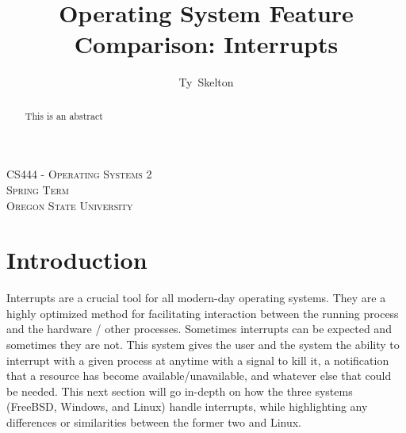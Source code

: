\documentclass[10pt,draftclsnofoot,onecolumn]{IEEEtran}
\begin{document}
\singlespacing %
\title{Operating System Feature Comparison: Interrupts}

\author{Ty~Skelton}

\maketitle

\begin{abstract}
This is an abstract
\end{abstract}

\begin{center}
\scshape %
CS444 - Operating Systems 2 \\  %
Spring Term\\[\baselineskip]    %
Oregon State University\par     %
\end{center}

\IEEEpeerreviewmaketitle

\newpage
{}
\tableofcontents
\newpage

\section{Introduction}
\label{sec:Introduction}
\par Interrupts are a crucial tool for all modern-day operating systems.
They are a highly optimized method for facilitating interaction between the running process and the hardware / other processes.
Sometimes interrupts can be expected and sometimes they are not.
This system gives the user and the system the ability to interrupt with a given process at anytime with a signal to kill it, a notification that a resource has become available/unavailable, and whatever else that could be needed.
This next section will go in-depth on how the three systems (FreeBSD, Windows, and Linux) handle interrupts, while highlighting any differences or similarities between the former two and Linux.

\end{document}
